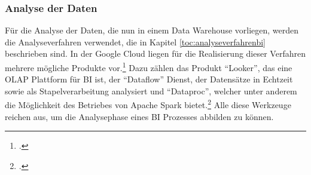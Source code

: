 \subsubsection{Analyse der Daten} \label{toc:datenanalyse}

Für die Analyse der Daten, die nun in einem Data Warehouse vorliegen, werden die Analyseverfahren verwendet, die in
Kapitel \ref{toc:analyseverfahrenbi} beschrieben sind. In der Google Cloud liegen für die Realisierung dieser Verfahren
mehrere mögliche Produkte vor.\footcite[Vgl.][]{googlecloud2021dw} Dazu zählen das Produkt "`Looker"', das eine \ac{OLAP} Plattform für \ac{BI}
ist, der "`Dataflow"' Dienst, der Datensätze in Echtzeit sowie als Stapelverarbeitung analysiert und "`Dataproc"', welcher
unter anderem die Möglichkeit des Betriebes von Apache Spark bietet.\footcite[Vgl.][]{googlecloud2021dw} Alle diese Werkzeuge reichen aus, um die Analysephase
eines \ac{BI} Prozesses abbilden zu können. 

